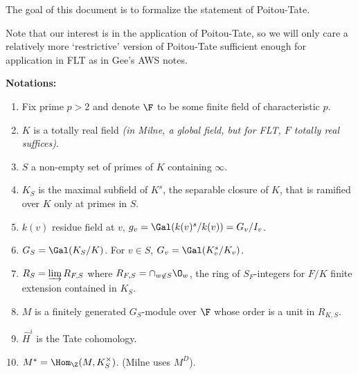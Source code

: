 \documentclass[11pt]{article}
\date{\today}
\begin{document}
The goal of this document is to formalize the statement of Poitou-Tate.%

\bigskip
Note that our interest is in the application of Poitou-Tate, so we will only care a relatively more `restrictive' version of Poitou-Tate sufficient enough for application in FLT as in Gee's AWS notes.

\bigskip
\textbf{Notations:}
\begin{enumerate}
    \item Fix prime $p > 2$ and denote $\F$ to be some finite field of characteristic $p$.
    \item $K$ is a totally real field \textit{(in Milne, a global field, but for FLT, $F$ totally real suffices)}.
    \item $S$ a non-empty set of primes of $K$ containing $\infty$.
    \item $K_S$ is the maximal subfield of $K^s$, the separable closure of $K$, that is ramified over $K$ only at primes in $S$.
    \item $k(v)$ residue field at $v$, $g_v = \Gal(k(v)^s / k(v)) = G_v / I_v$.
    \item $G_S = \Gal (K_S/K)$. For $v \in S$, $G_v  = \Gal(K_v^s / K_v)$.
    \item $R_S = \varinjlim R_{F, S}$ where $R_{F, S} = \cap_{w \not\in S} \O_w$, the ring of $S_F$-integers for $F/K$ finite extension contained in $K_S$.
    \item $M$ is a finitely generated $G_S$-module over $\F$ whose order is a unit in $R_{K, S}$.
    \item $\hat{H}^i$ is the Tate cohomology.
    \item $M^* = \Hom_{\Z} (M, K_S^\times)$. (Milne uses $M^D$).
\end{enumerate}

\end{document}
